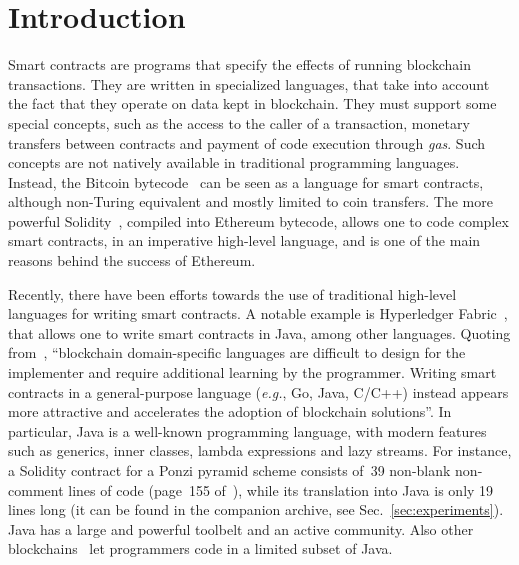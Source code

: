 \section{Introduction}\label{sec:introduction}

Smart contracts are programs that specify the effects of running blockchain transactions.
They are written in specialized languages, that take into account
the fact that they operate on data kept in blockchain. They must
support some special concepts, such as the access to the caller of a transaction,
monetary transfers between contracts
and payment of code execution through \emph{gas}.
Such concepts are not natively available
in traditional programming languages.
Instead, the Bitcoin bytecode~\cite{Antonopoulos17,Nakamoto08}
can be seen as a language for smart contracts,
although non-Turing equivalent and mostly limited to coin transfers. The more
powerful Solidity~\cite{AntonopoulosW18},
compiled into Ethereum bytecode, allows one to code
complex smart contracts, in an imperative high-level language, and is
one of the main reasons behind the success of Ethereum.

Recently, there have been efforts towards the use of traditional
high-level languages for writing smart contracts.
A notable example is Hyperledger Fabric~\cite{AndroulakiBBCCC18,Vukolic17}, that allows one
to write smart contracts in Java, among other languages. Quoting from~\cite{AndroulakiBBCCC18},
``blockchain domain-specific languages are difficult to design for the implementer
and require additional learning by the programmer. Writing smart contracts
in a general-purpose language (\emph{e.g.}, Go, Java, C/C++) instead
appears more attractive and accelerates the adoption of blockchain solutions''.
In particular, Java is a well-known programming language,
with modern features such as generics, inner classes, lambda
expressions and lazy streams. For instance, a Solidity contract
for a Ponzi pyramid scheme consists of~39 non-blank non-comment lines of code
(page~155 of~\cite{IyerD18}), while its translation into Java is only 19 lines
long (it can be found in the companion archive,
see Sec.~\ref{sec:experiments}).
Java has a large and powerful toolbelt and an active community.
Also other blockchains~\cite{aion,aion_example_contract,neo,neo_contract,Spoto19}
let programmers code in a limited subset of Java.

